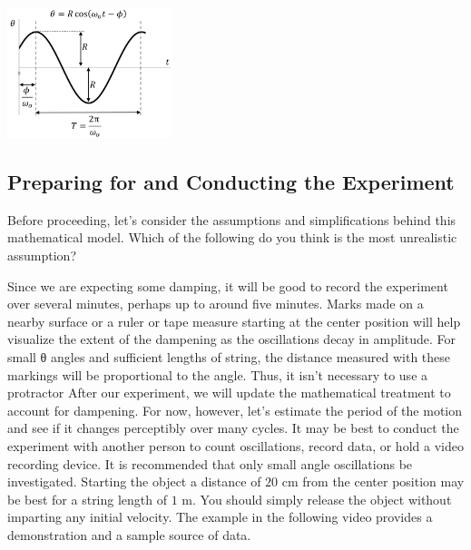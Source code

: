 \documentclass{ximera}
\begin{document}

\begin{image}
 \includegraphics[height=1.5in]{graphofPendulum.jpg}
\end{image}

\subsection*{Preparing for and Conducting the Experiment}

\begin{problem}
Before proceeding, let’s consider the assumptions and simplifications behind this mathematical model.  Which of the following do you think is the most unrealistic assumption?
  \begin{multipleChoice}
    \end{multipleChoice}
\end{problem}

Since we are expecting some damping, it will be good to record the experiment over several minutes, perhaps up to around five minutes.  Marks made on a nearby surface or a ruler or tape measure starting at the center position will help visualize the extent of the dampening as the oscillations decay in amplitude.  For small θ angles and sufficient lengths of string, the distance measured with these markings will be proportional to the angle.  Thus, it isn’t necessary to use a protractor  After our experiment, we will update the mathematical treatment to account for dampening.  For now, however, let’s estimate the period of the motion and see if it changes perceptibly over many cycles.  It may be best to conduct the experiment with another person to count oscillations, record data, or hold a video recording device.  It is recommended that only small angle oscillations be investigated.  Starting the object a distance of $20$ cm from the center position may be best for a string length of $1$ m.  You should simply release the object without imparting any initial velocity.  
The example in the following video provides a demonstration and a sample source of data.
\end{document}
